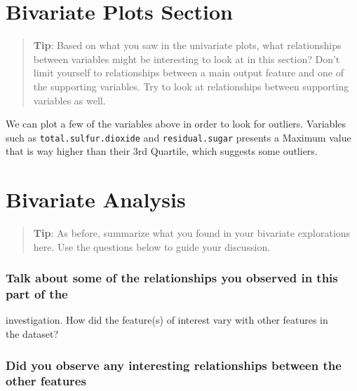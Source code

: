 \documentclass[]{article}
\begin{document}
\hypertarget{bivariate-plots-section}{%
\section{Bivariate Plots Section}\label{bivariate-plots-section}}

\begin{quote}
\textbf{Tip}: Based on what you saw in the univariate plots, what
relationships between variables might be interesting to look at in this
section? Don't limit yourself to relationships between a main output
feature and one of the supporting variables. Try to look at
relationships between supporting variables as well.
\end{quote}

We can plot a few of the variables above in order to look for outliers.
Variables such as \texttt{total.sulfur.dioxide} and
\texttt{residual.sugar} presents a Maximum value that is way higher than
their 3rd Quartile, which suggests some outliers.

\hypertarget{bivariate-analysis}{%
\section{Bivariate Analysis}\label{bivariate-analysis}}

\begin{quote}
\textbf{Tip}: As before, summarize what you found in your bivariate
explorations here. Use the questions below to guide your discussion.
\end{quote}

\hypertarget{talk-about-some-of-the-relationships-you-observed-in-this-part-of-the}{%
\subsubsection{\texorpdfstring{Talk about some of the relationships you
observed in this part of the\\
}{Talk about some of the relationships you observed in this part of the }}\label{talk-about-some-of-the-relationships-you-observed-in-this-part-of-the}}

investigation. How did the feature(s) of interest vary with other
features in\\
the dataset?

\hypertarget{did-you-observe-any-interesting-relationships-between-the-other-features}{%
\subsubsection{\texorpdfstring{Did you observe any interesting
relationships between the other features\\
}{Did you observe any interesting relationships between the other features }}\label{did-you-observe-any-interesting-relationships-between-the-other-features}}
\end{document}
